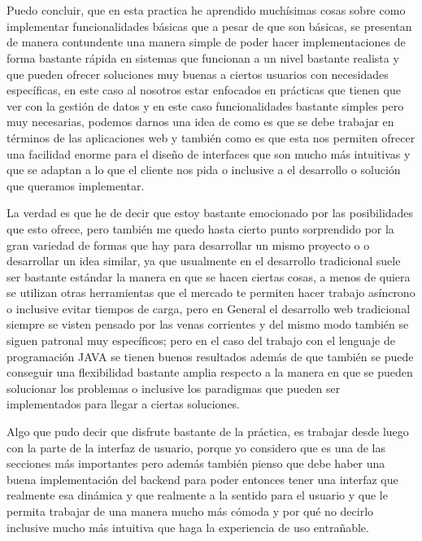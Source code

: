 \documentclass[10pt,a4paper]{article}
\begin{document}
\pagebreak


\section{\color{colorIPN}{Conclusión}}

Puedo concluir, que en esta practica he aprendido muchísimas cosas sobre como implementar funcionalidades básicas que a pesar de que son básicas, se presentan de manera contundente una manera simple de poder hacer implementaciones de forma bastante rápida en sistemas que funcionan a un nivel bastante realista y que pueden ofrecer soluciones muy buenas a ciertos usuarios con necesidades específicas, en este caso al nosotros estar enfocados en prácticas que tienen que ver con la gestión de datos y en este caso funcionalidades bastante simples pero muy necesarias, podemos darnos una idea de como es que se debe trabajar en términos de las aplicaciones web y también como es que esta nos permiten ofrecer una facilidad enorme para el diseño de interfaces que son mucho más intuitivas y que se adaptan a lo que el cliente nos pida o inclusive a el desarrollo o solución que queramos implementar.

\vspace{5mm}

La verdad es que he de decir que estoy bastante emocionado por las posibilidades que esto ofrece, pero también me quedo hasta cierto punto sorprendido por la gran variedad de formas que hay para desarrollar un mismo proyecto o o desarrollar un idea similar, ya que usualmente en el desarrollo tradicional suele ser bastante estándar la manera en que se hacen ciertas cosas, a menos de quiera se utilizan otras herramientas que el mercado te permiten hacer trabajo asíncrono o inclusive evitar tiempos de carga, pero en General el desarrollo web tradicional siempre se visten pensado por las venas corrientes y del mismo modo también se siguen patronal muy específicos; pero en el caso del trabajo con el lenguaje de programación JAVA se tienen buenos resultados además de que también se puede conseguir una flexibilidad bastante amplia respecto a la manera en que se pueden solucionar los problemas o inclusive los paradigmas que pueden ser implementados para llegar a ciertas soluciones.

\vspace{5mm}

Algo que pudo decir que disfrute bastante de la práctica, es trabajar desde luego con la parte de la interfaz de usuario, porque yo considero que es una de las secciones más importantes pero además también pienso que debe haber una buena implementación del backend para poder entonces tener una interfaz que realmente esa dinámica y que realmente a la sentido para el usuario y que le permita trabajar de una manera mucho más cómoda y por qué no decirlo inclusive mucho más intuitiva que haga la experiencia de uso entrañable.
\vspace{5mm}
\end{document}
